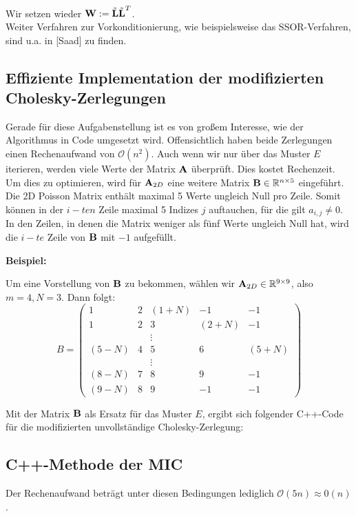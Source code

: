 Wir setzen wieder ${\textbf{W}} := \tilde{{\textbf{L}}} \tilde{{\textbf{L}}}^{T}$. \\

Weiter Verfahren zur Vorkonditionierung, wie beispielsweise das SSOR-Verfahren, sind u.a. in [Saad] zu finden.

\subsection{Effiziente Implementation der modifizierten Cholesky-Zerlegungen}

Gerade für diese Aufgabenstellung ist es von großem Interesse, wie der Algorithmus in Code umgesetzt wird. Offensichtlich haben beide Zerlegungen einen Rechenaufwand von $\mathcal{O}(n^{2})$. Auch wenn wir nur über das Muster $E$ iterieren, werden viele Werte der Matrix ${\textbf{A}}$ überprüft. Dies kostet Rechenzeit.\\
Um dies zu optimieren, wird für ${\textbf{A}}_{2D}$ eine weitere Matrix ${\textbf{B}} \in \mathbb{R}^{n \times 5}$ eingeführt. Die 2D Poisson Matrix enthält maximal 5 Werte ungleich Null pro Zeile. Somit können in der $i - ten$ Zeile maximal 5 Indizes $j$ auftauchen, für die gilt $a_{i,j} \ne 0$. In den Zeilen, in denen die Matrix weniger als fünf Werte ungleich Null hat, wird die $i - te$ Zeile von ${\textbf{B}}$ mit $-1$ aufgefüllt.

\textbf{Beispiel:}

Um eine Vorstellung von ${\textbf{B}}$ zu bekommen, wählen wir ${\textbf{A}}_{2D} \in \mathbb{R}^{9 \times 9}$, also $m = 4, N = 3$. Dann folgt:
\begin{equation}
B = 
\begin{pmatrix}
1 & 2 & (1+N) & -1 & -1\\
1 & 2 & 3 & (2+N) & -1\\
  &   & \vdots & &\\
(5-N) & 4 & 5 & 6 & (5+N)\\
  &   & \vdots & &\\
(8-N) & 7 & 8 & 9 & -1\\
(9-N) & 8 & 9 & -1 & -1
\end{pmatrix}
\end{equation}

Mit der Matrix ${\textbf{B}}$ als Ersatz für das Muster $E$, ergibt sich folgender C++-Code für die modifizierten unvollständige Cholesky-Zerlegung:

\subsection{C++-Methode der MIC}\label{s.MIC}
Der Rechenaufwand beträgt unter diesen Bedingungen lediglich $\mathcal{O}(5n) \approx \mathcal{0}(n)$.

